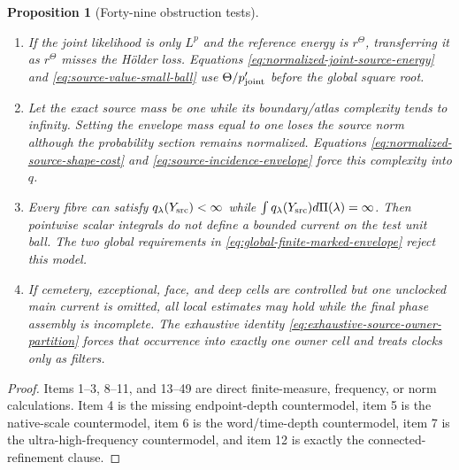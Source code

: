 \documentclass[11pt]{article}
\newtheorem{proposition}[theorem]{Proposition}
\begin{document}
\begin{proposition}[Forty-nine obstruction tests]
\begin{enumerate}[label=\textup{(T\arabic*)}]
      the explicit bounded-holonomy $\mathrm{CARRIER\_MATCH}$ alternative.
\item If the joint likelihood is only $L^p$ and the reference energy is
      $r^\Theta$, transferring it as $r^\Theta$ misses the H\"older loss.
      Equations \eqref{eq:normalized-joint-source-energy} and
      \eqref{eq:source-value-small-ball} use
      $\Theta/p_{\rm joint}'$ before the global square root.
\item Let the exact source mass be one while its boundary/atlas complexity
      tends to infinity.  Setting the envelope mass equal to one loses the
      source norm although the probability section remains normalized.
      Equations \eqref{eq:normalized-source-shape-cost} and
      \eqref{eq:source-incidence-envelope} force this complexity into $q$.
\item Every fibre can satisfy $q_\lambda(Y_{\rm src})<\infty$ while
      $\int q_\lambda(Y_{\rm src})d\Pi(\lambda)=\infty$.  Then pointwise
      scalar integrals do not define a bounded current on the test unit ball.
      The two global requirements in
      \eqref{eq:global-finite-marked-envelope} reject this model.
\item If cemetery, exceptional, face, and deep cells are controlled but one
      unclocked main current is omitted, all local estimates may hold while
      the final phase assembly is incomplete.  The exhaustive identity
      \eqref{eq:exhaustive-source-owner-partition} forces that occurrence
      into exactly one owner cell and treats clocks only as filters.
\end{enumerate}
\end{proposition}

\begin{proof}
Items 1--3, 8--11, and 13--49 are direct finite-measure, frequency, or norm
calculations.  Item 4 is the missing endpoint-depth countermodel, item 5 is
the native-scale countermodel, item 6 is the word/time-depth countermodel,
item 7 is the ultra-high-frequency countermodel, and item 12 is exactly the
connected-refinement clause.
\end{proof}
\end{document}
